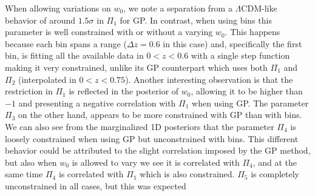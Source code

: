 \documentclass[twocolumn,a4paper,reprint,amssymb,aps,prd,groupedaddress,superscriptaddress,nofootinbib]{revtex4-2}
\begin{document}
When allowing variations on $w_0$, we note a separation from a $\Lambda$CDM-like behavior of around
$1.5\sigma$ in $\Pi_1$ for GP. In contrast, when using bins this parameter is well constrained
with or without a varying $w_0$. This happens because each bin spans a range ($\Delta z = 0.6$
in this case) and, specifically the first bin, is fitting all the available data in $0<z<0.6$
with a single step function making it very constrained, unlike its GP counterpart which uses both
$\Pi_1$ and $\Pi_2$ (interpolated in $0<z<0.75$). Another interesting observation is that the
restriction in $\Pi_1$ is reflected in the posterior of $w_0$, allowing it to be higher than $-1$
and presenting a negative correlation with $\Pi_1$ when using GP. The parameter $\Pi_3$ on the other hand,
appears to be more constrained with GP than with bins. We can also see from the marginalized 1D
posteriors that the parameter $\Pi_4$ is loosely constrained when using GP but unconstrained with
bins.
This different behavior could be attributed to the slight correlation imposed by the GP
method, but also when $w_0$
is allowed to vary we see it is correlated with $\Pi_4$, and at the same time $\Pi_4$ is
correlated with $\Pi_1$ which is also constrained.
$\Pi_5$ is completely unconstrained in all cases, but this was expected
\end{document}
